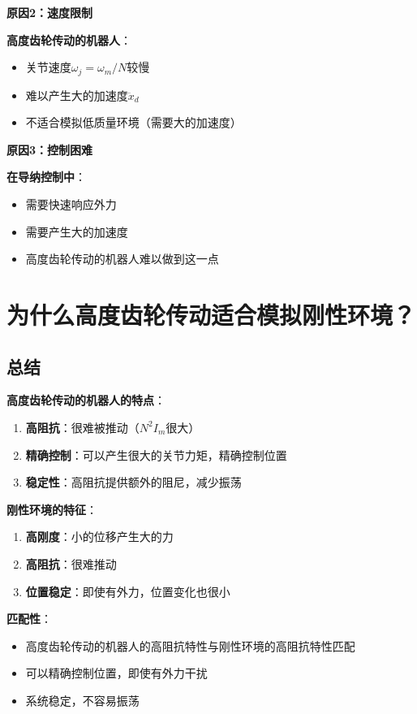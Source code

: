\documentclass[12pt,a4paper]{article}
\begin{document}
\textbf{原因2：速度限制}

\textbf{高度齿轮传动的机器人}：
\begin{itemize}
\item 关节速度$\omega_j = \omega_m/N$较慢
\item 难以产生大的加速度$\ddot{x}_d$
\item 不适合模拟低质量环境（需要大的加速度）
\end{itemize}

\textbf{原因3：控制困难}

\textbf{在导纳控制中}：
\begin{itemize}
\item 需要快速响应外力
\item 需要产生大的加速度
\item 高度齿轮传动的机器人难以做到这一点
\end{itemize}

\section{为什么高度齿轮传动适合模拟刚性环境？}

\subsection{总结}

\textbf{高度齿轮传动的机器人的特点}：
\begin{enumerate}
\item \textbf{高阻抗}：很难被推动（$N^2 I_m$很大）
\item \textbf{精确控制}：可以产生很大的关节力矩，精确控制位置
\item \textbf{稳定性}：高阻抗提供额外的阻尼，减少振荡
\end{enumerate}

\textbf{刚性环境的特征}：
\begin{enumerate}
\item \textbf{高刚度}：小的位移产生大的力
\item \textbf{高阻抗}：很难推动
\item \textbf{位置稳定}：即使有外力，位置变化也很小
\end{enumerate}

\textbf{匹配性}：
\begin{itemize}
\item 高度齿轮传动的机器人的高阻抗特性与刚性环境的高阻抗特性匹配
\item 可以精确控制位置，即使有外力干扰
\item 系统稳定，不容易振荡
\end{itemize}
\end{document}
